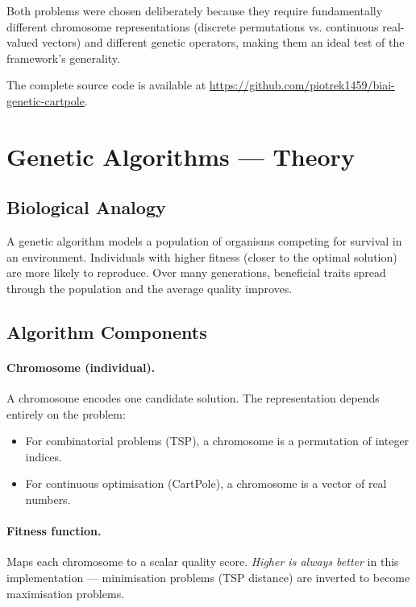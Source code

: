 \documentclass[12pt,a4paper]{article}
\begin{document}
Both problems were chosen deliberately because they require fundamentally different chromosome representations (discrete permutations vs. continuous real-valued vectors) and different genetic operators, making them an ideal test of the framework's generality.

The complete source code is available at \url{https://github.com/piotrek1459/biai-genetic-cartpole}.

\section{Genetic Algorithms — Theory}
\label{sec:theory}

\subsection{Biological Analogy}

A genetic algorithm models a population of organisms competing for survival in an environment. Individuals with higher fitness (closer to the optimal solution) are more likely to reproduce. Over many generations, beneficial traits spread through the population and the average quality improves.

\subsection{Algorithm Components}

\paragraph{Chromosome (individual).}
A chromosome encodes one candidate solution. The representation depends entirely on the problem:
\begin{itemize}
    \item For combinatorial problems (TSP), a chromosome is a permutation of integer indices.
    \item For continuous optimisation (CartPole), a chromosome is a vector of real numbers.
\end{itemize}

\paragraph{Fitness function.}
Maps each chromosome to a scalar quality score. \emph{Higher is always better} in this implementation — minimisation problems (TSP distance) are inverted to become maximisation problems.
\end{document}
